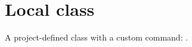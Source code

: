 \documentclass{fixtureclass}\listfiles
\begin{document}
\maketitle\section{Local class}A project-defined class with a custom command: \fixturemark.
\end{document}
